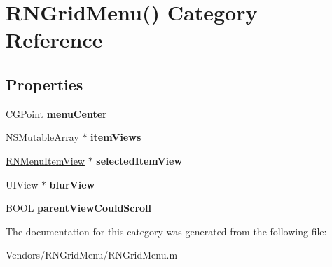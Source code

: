 \hypertarget{category_r_n_grid_menu_07_08}{}\section{R\+N\+Grid\+Menu() Category Reference}
\label{category_r_n_grid_menu_07_08}
\subsection*{Properties}
\begin{DoxyCompactItemize}
\item 
\hypertarget{category_r_n_grid_menu_07_08_a7aead2397c3d70ea3d7024f6f0a4ef86}{}C\+G\+Point {\bfseries menu\+Center}\label{category_r_n_grid_menu_07_08_a7aead2397c3d70ea3d7024f6f0a4ef86}

\item 
\hypertarget{category_r_n_grid_menu_07_08_ae5e36e6465767b806ab291f0cdc26989}{}N\+S\+Mutable\+Array $\ast$ {\bfseries item\+Views}\label{category_r_n_grid_menu_07_08_ae5e36e6465767b806ab291f0cdc26989}

\item 
\hypertarget{category_r_n_grid_menu_07_08_a1f83c903530d846b49a90f9c34645a5e}{}\hyperlink{interface_r_n_menu_item_view}{R\+N\+Menu\+Item\+View} $\ast$ {\bfseries selected\+Item\+View}\label{category_r_n_grid_menu_07_08_a1f83c903530d846b49a90f9c34645a5e}

\item 
\hypertarget{category_r_n_grid_menu_07_08_addea3b94a35115a4b2d7973a906df7d3}{}U\+I\+View $\ast$ {\bfseries blur\+View}\label{category_r_n_grid_menu_07_08_addea3b94a35115a4b2d7973a906df7d3}

\item 
\hypertarget{category_r_n_grid_menu_07_08_a04ce8e361f5811dd5cf49bcd6aa1d4b6}{}B\+O\+O\+L {\bfseries parent\+View\+Could\+Scroll}\label{category_r_n_grid_menu_07_08_a04ce8e361f5811dd5cf49bcd6aa1d4b6}

\end{DoxyCompactItemize}


The documentation for this category was generated from the following file\+:\begin{DoxyCompactItemize}
\item 
Vendors/\+R\+N\+Grid\+Menu/R\+N\+Grid\+Menu.\+m\end{DoxyCompactItemize}

